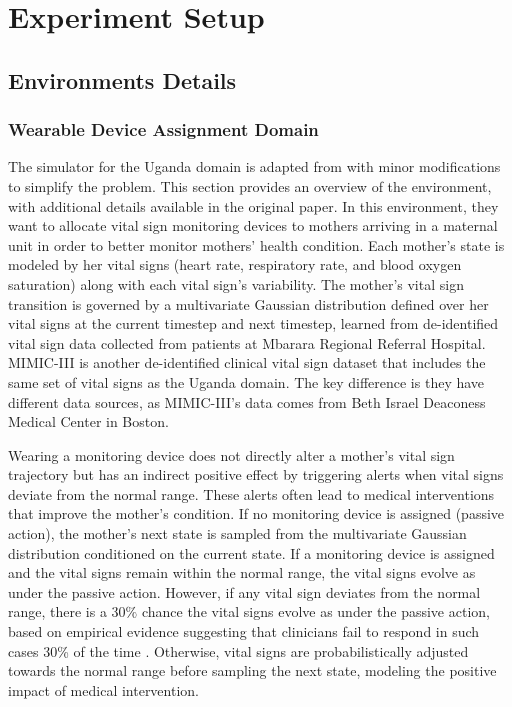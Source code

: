 \section{Experiment Setup}
\label{appdx:setup}


\subsection{Environments Details}
\label{appdx:env-details}




\subsubsection{Wearable Device Assignment Domain}\label{appdx:health_care}
 

The simulator for the Uganda domain is adapted from \citep{boehmer2024optimizing} with minor modifications to simplify the problem.  This section provides an overview of the environment, with additional details available in the original paper.  In this environment, they want to allocate vital sign monitoring devices to mothers arriving in a maternal unit in order to better monitor mothers' health condition. Each mother's state is modeled by her vital signs (heart rate, respiratory rate, and blood oxygen saturation) along with each vital sign's variability. The mother's vital sign transition is governed by a multivariate Gaussian distribution defined over her vital signs at the current timestep and next timestep, learned from de-identified vital sign data collected from patients at Mbarara Regional Referral Hospital. MIMIC-III \cite{johnson2016mimic} is another de-identified clinical vital sign dataset that includes the same set of vital signs as the Uganda domain. The key difference is they have different data sources, as MIMIC-III's data comes from Beth Israel Deaconess Medical Center in Boston.

Wearing a monitoring device does not directly alter a mother's vital sign trajectory but has an indirect positive effect by triggering alerts when vital signs deviate from the normal range. These alerts often lead to medical interventions that improve the mother's condition.  If no monitoring device is assigned (passive action), the mother's next state is sampled from the multivariate Gaussian distribution conditioned on the current state. If a monitoring device is assigned and the vital signs remain within the normal range, the vital signs evolve as under the passive action. However, if any vital sign deviates from the normal range,  there is a $30\%$ chance the vital signs evolve as under the passive action, based on empirical evidence suggesting that clinicians fail to respond in such cases 30\% of the time \citep{boatin2021wireless}. Otherwise, vital signs are probabilistically adjusted towards the normal range before sampling the next state, modeling the positive impact of medical intervention.

